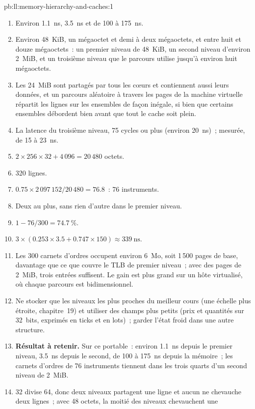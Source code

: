 \begin{solution}{pb:ll:memory-hierarchy-and-caches:1}
\begin{enumerate}
\item Environ \qty{1.1}{\nano\second}, \qty{3.5}{\nano\second} et de 100 à \qty{175}{\nano\second}.
\item Environ 48~KiB, un mégaoctet et demi à deux mégaoctets, et entre huit et douze mégaoctets~: un premier niveau de 48~KiB,
un second niveau d'environ 2~MiB, et un troisième niveau que le parcours utilise jusqu'à environ huit mégaoctets.
\item Les 24~MiB sont partagés par tous les cœurs et contiennent aussi leurs données, et un parcours aléatoire à travers les pages de la machine virtuelle
répartit les lignes sur les ensembles de façon inégale, si bien que certains ensembles débordent bien avant que tout le cache soit plein.
\item La latence du troisième niveau, 75 cycles ou plus (environ \qty{20}{\nano\second})~; mesurée, de 15 à
\qty{23}{\nano\second}.
\item $2 \times 256 \times 32 + 4\,096 = 20\,480$ octets.
\item 320 lignes.
\item $0.75 \times 2\,097\,152 / 20\,480 = 76.8$~: 76 instruments.
\item Deux au plus, sans rien d'autre dans le premier niveau.
\item $1 - 76/300 = 74.7~\%$.
\item $3 \times (0.253 \times 3.5 + 0.747 \times 150) \approx \qty{339}{\nano\second}$.
\item Les 300 carnets d'ordres occupent environ 6~Mo, soit 1\,500 pages de base, davantage que ce que couvre le TLB de premier niveau~; avec des pages de 2~MiB, trois
entrées suffisent. Le gain est plus grand sur un hôte virtualisé, où chaque parcours est bidimensionnel.
\item Ne stocker que les niveaux les plus proches du meilleur cours (une échelle plus étroite, chapitre~19) et utiliser des champs plus petits (prix et
quantités sur 32~bits, exprimés en ticks et en lots)~; garder l'état froid dans une autre structure.
\item \textbf{Résultat à retenir.} Sur ce portable~: environ \qty{1.1}{\nano\second} depuis le premier niveau,
\qty{3.5}{\nano\second} depuis le second, de 100 à \qty{175}{\nano\second} depuis la mémoire~; les carnets d'ordres de 76 instruments tiennent dans
les trois quarts d'un second niveau de 2~MiB.
\item 32 divise 64, donc deux niveaux partagent une ligne et aucun ne chevauche deux lignes~; avec 48 octets, la moitié des niveaux chevauchent une

\end{enumerate}
\end{solution}
